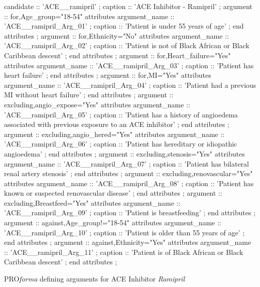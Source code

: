 \documentclass[11pt]{article}
\begin{document}
\begin{code}[ht]
\begin{html}
candidate :: 'ACE__ramipril' ;
          caption :: 'ACE Inhibitor - Ramipril' ;
          argument :: for,Age_group="18-54"            attributes
               argument_name :: 'ACE__ramipril_Arg_01' ;
               caption :: 'Patient is under 55 years of age' ;
          end attributes
          ;
          argument :: for,Ethnicity="No"            attributes
               argument_name :: 'ACE__ramipril_Arg_02' ;
               caption :: 'Patient is not of Black African or Black Caribbean descent' ;
          end attributes
          ;
          argument :: for,Heart_failure="Yes"            attributes
               argument_name :: 'ACE__ramipril_Arg_03' ;
               caption :: 'Patient has heart failure' ;
          end attributes
          ;
          argument :: for,MI="Yes"            attributes
               argument_name :: 'ACE__ramipril_Arg_04' ;
               caption :: 'Patient had a previous MI without heart failure' ;
          end attributes
          ;
          argument :: excluding,angio_expose="Yes"            attributes
               argument_name :: 'ACE__ramipril_Arg_05' ;
               caption :: 'Patient has a history of angioedema associated with previous exposure to an ACE inhibitor' ;
          end attributes
          ;
          argument :: excluding,angio_hered="Yes"            attributes
               argument_name :: 'ACE__ramipril_Arg_06' ;
               caption :: 'Patient has hereditary or idiopathic angioedema' ;
          end attributes
          ;
          argument :: excluding,stenosis="Yes"            attributes
               argument_name :: 'ACE__ramipril_Arg_07' ;
               caption :: 'Patient has bilateral renal artery stenosis' ;
          end attributes
          ;
          argument :: excluding,renovascular="Yes"            attributes
               argument_name :: 'ACE__ramipril_Arg_08' ;
               caption :: 'Patient has known or suspected renovascular disease' ;
          end attributes
          ;
          argument :: excluding,Breastfeed="Yes"            attributes
               argument_name :: 'ACE__ramipril_Arg_09' ;
               caption :: 'Patient is breastfeeding' ;
          end attributes
          ;
          argument :: against,Age_group!="18-54"    attributes
               argument_name :: 'ACE__ramipril_Arg_10' ;
               caption :: 'Patient is older than 55 years of age' ;
          end attributes
          ;
          argument :: against,Ethnicity="Yes"    attributes
               argument_name :: 'ACE__ramipril_Arg_11' ;
               caption :: 'Patient is of Black African or Black Caribbean descent' ;
          end attributes
          ;
\end{html}
\caption{PRO\textit{forma} defining arguments for ACE Inhibitor \textit{Ramipril}}
\label{code:ramipril}
\end{code}
\end{document}
